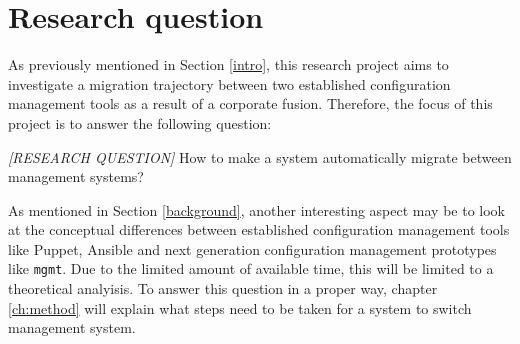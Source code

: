 \section{Research question}\label{sec:researchquestion}
As previously mentioned in Section \ref{intro}, this research project aims to investigate a migration trajectory between two established configuration management tools as a result of a corporate fusion. Therefore, the focus of this project is to answer the following question:

\textit{[RESEARCH QUESTION]}
How to make a system automatically migrate between management systems?

As mentioned in Section \ref{background}, another interesting aspect may be to look at the conceptual differences between established configuration management tools like Puppet, Ansible and next generation configuration management prototypes like \texttt{mgmt}. Due to the limited amount of available time, this will be limited to a theoretical analyisis. 
To answer this question in a proper way, chapter \ref{ch:method} will explain what steps need to be taken for a system to switch management system.
